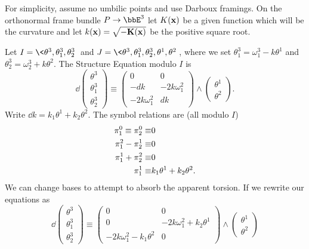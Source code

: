\begin{example}
    For simplicity, assume no umbilic points and use Darboux framings. On the orthonormal frame bundle $P\to \bbE^3$ let $K(\bf{x})$ be a given function which will be the curvature and let $k(\bf{x})=\sqrt{-K(\bf{x})}$ be the positive square root.

    Let $I=\<\theta^3,\theta^3_1,\theta^3_2\>$ and $J=\<\theta^3,\theta^3_1,\theta^3_2,\theta^1,\theta^2\>$, where we set $\theta^3_1=\omega^3_1-k\theta^1$ and $\theta^3_2=\omega^3_2+k\theta^2$. The Structure Equation modulo $I$ is 
    \[\dd\begin{pmatrix}
        \theta^3\\\theta^3_1\\\theta^3_2
    \end{pmatrix}\equiv 
    \begin{pmatrix}
        0 & 0\\
        -dk & -2k\omega^2_1\\
        -2k\omega^2_1 & dk
    \end{pmatrix}
    \wedge \begin{pmatrix}
        \theta^1\\\theta^2
    \end{pmatrix}.
    \]
    Write $\dd k=k_1\theta^1+k_2\theta^2$. The symbol relations are  (all modulo $I$)
    \begin{align}
        \pi^0_1\equiv \pi^0_2\equiv& 0 \notag\\
        \pi^2_1-\pi^1_2\equiv& 0\notag\\
        \pi^1_1+\pi^2_2\equiv& 0\notag\\
        \pi^1_1\equiv& k_1\theta^1+k_2\theta^2.
    \end{align}
    We can change bases to attempt to absorb the apparent torsion. If we rewrite our equations as 
    \[\dd\begin{pmatrix}
        \theta^3\\\theta^3_1\\\theta^3_2
    \end{pmatrix}\equiv 
    \begin{pmatrix}
        0 & 0\\
        0 & -2k\omega^2_1+k_2\theta^1\\
        -2k\omega^2_1-k_1\theta^2 & 0
    \end{pmatrix}
    \wedge \begin{pmatrix}
        \theta^1\\\theta^2

\end{pmatrix}\]
\end{example}
